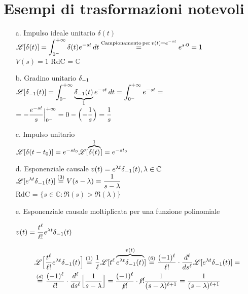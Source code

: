 \section{Esempi di trasformazioni notevoli}
   \begin{enumerate}
      \item[a.] Impulso ideale unitario $\delta(t)$\\
         $\displaystyle\mathscr{L}[\delta(t)] = \int_{0^-}^{+\infty}\delta(t)e^{-st}\,dt \overset{\mathrm{Campionamento\,per\,} v(t) = e^{-st}}{=} e^{s\cdot 0} = 1$\\
         $V(s) = 1$ RdC = $\mathbb{C}$
      \item[b.] Gradino unitario $\delta_{-1}$\\
         $\displaystyle\mathscr{L}[\delta_{-1}(t)] = \int_{0^-}^{+\infty}\underbrace{\delta_{-1}(t)}_{1}e^{-st}\,dt = \int_{0^-}^{+\infty} e^{-st} = $\\
         $\displaystyle = -\frac{e^{-st}}{s}\Big|_{0^-}^{+\infty} = 0 - \Bigl(-\frac{1}{s}\Bigr) = \frac{1}{s}$
      \item[c.] Impulso unitario\\
         $\mathscr{L}[\delta(t - t_0)] = e^{-st_0}\mathscr{L}[\overbrace{\delta(t)}^{1}] = e^{-st_0}$
      \item[d.] Esponenziale causale $v(t) = e^{\lambda t}\delta_{-1}(t), \lambda\in\mathbb{C}$\\
         $\displaystyle\mathscr{L}[e^{\lambda t}\delta_{-1}(t)] \overset{(3)}{=} V(s - \lambda) = \frac{1}{s -\lambda}$\\
         RdC = $\{s\in\mathbb{C} : \Re(s) > \Re(\lambda)\}$
      \item[e.] Esponenziale causale moltiplicata per una funzione polinomiale\\
         \begin{center}
            $\displaystyle v(t) = \frac{t^\ell}{\ell!}e^{\lambda t}\delta_{-1}(t)$
         \end{center}
         \[
            \begin{split}
               &\LA\Bigl[\frac{t^\ell}{\ell!}e^{\lambda t}\gradino(t)\Bigr] \overset{(1)}{=} \frac{1}{\ell}\LA[t^\ell \overbrace{e^{\lambda t}\gradino(t)}^{v(t)}] \overset{(6)}{=} \frac{(-1)^\ell}{\ell!}\cdot\frac{d^\ell}{ds^\ell}\LA[e^{\lambda t}\gradino(t)] =\\
               &\overset{(d)}{=} \frac{(-1)^\ell}{\ell!}\cdot\frac{d^\ell}{ds^\ell}\Bigl[\frac{1}{s - \lambda}\Bigr] = \frac{(-1)^\ell}{\cancel{\ell!}}\cdot\cancel{\ell!}\frac{1}{(s - \lambda)^{\ell + 1}} = \frac{1}{(s - \lambda)^{\ell + 1}}

\end{split}\]
\end{enumerate}
